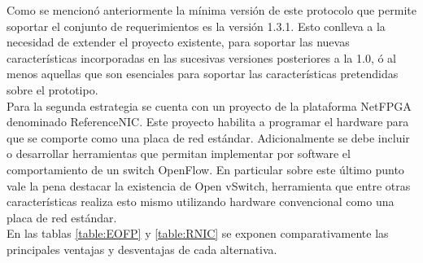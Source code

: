 Como se mencion\'o anteriormente la m\'inima versi\'on de este protocolo que permite soportar el conjunto de requerimientos es la versi\'on 1.3.1. Esto conlleva a la necesidad de extender el proyecto existente, para soportar las nuevas caracter\'isticas incorporadas en las sucesivas versiones posteriores a la 1.0, \'o al menos aquellas que son esenciales para soportar las caracter\'isticas pretendidas sobre el prototipo.\\

Para la segunda estrategia se cuenta con un proyecto de la plataforma NetFPGA denominado ReferenceNIC. Este proyecto habilita a programar el hardware para que se comporte como una placa de red estándar. Adicionalmente se debe incluir o desarrollar herramientas que permitan implementar por software el comportamiento de un switch OpenFlow. En particular sobre este \'ultimo punto vale la pena destacar la existencia de Open vSwitch, herramienta que entre otras caracter\'isticas realiza esto mismo utilizando hardware convencional como una placa de red estándar.\\

En las tablas \ref{table:EOFP} y \ref{table:RNIC} se exponen comparativamente las principales ventajas y desventajas de cada alternativa.

